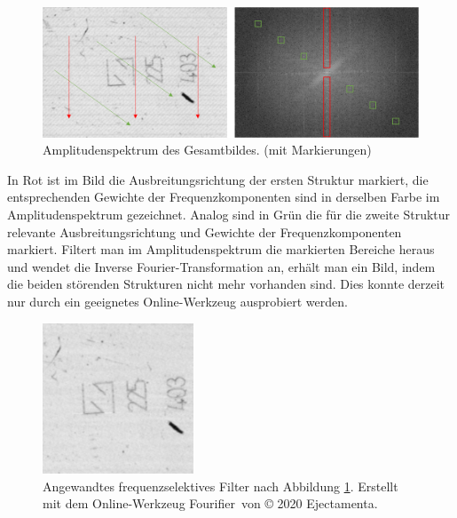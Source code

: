 \begin{figure}[H]
	\centering
	\includegraphics[width=\textwidth]{03_sichtpruefungDurchLichtreflexionen/optimierungen/figures/amplitudeSpectrum}
	\caption[Amplitudenspektrum des Gesamtbildes]{Amplitudenspektrum des Gesamtbildes. (mit Markierungen)}
	\label{img:amplitudeSpectrum}
\end{figure}

\noindent
In Rot ist im Bild die Ausbreitungsrichtung der ersten Struktur markiert, die entsprechenden Gewichte der Frequenzkomponenten sind in derselben Farbe im Amplitudenspektrum gezeichnet.
Analog sind in Grün die für die zweite Struktur relevante Ausbreitungsrichtung und Gewichte der Frequenzkomponenten markiert.
Filtert man im Amplitudenspektrum die markierten Bereiche heraus und wendet die Inverse Fourier-Transformation an, erhält man ein Bild, indem die beiden störenden Strukturen nicht mehr vorhanden sind.
Dies konnte derzeit nur durch ein geeignetes Online-Werkzeug \cite{fourierTool} ausprobiert werden.

\begin{figure}[H]
	\centering
	\includegraphics[width=0.4\textwidth]{03_sichtpruefungDurchLichtreflexionen/optimierungen/figures/frequencyFiltered}
	\caption[Bild mit angewandtem frequenzselektives Filter]{Angewandtes frequenzselektives Filter nach Abbildung \ref{img:amplitudeSpectrum}. Erstellt mit dem Online-Werkzeug \glqq Fourifier\grqq ~von © 2020 Ejectamenta.\cite{fourierTool}\footnotemark}
	\label{img:frequencyFiltered}
\end{figure}

